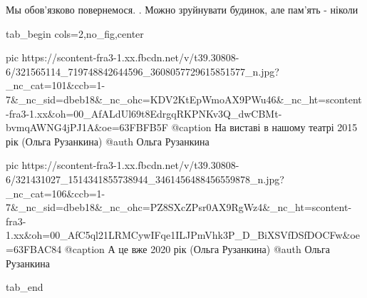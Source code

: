  
 
 
 
 


Мы обов'язково повернемося. . Можно зруйнувати будинок, але пам'ять - ніколи

\begin{center}
\begin{minipage}{\textwidth}

\ifcmt
  tab_begin cols=2,no_fig,center

     pic https://scontent-fra3-1.xx.fbcdn.net/v/t39.30808-6/321565114_719748842644596_3608057729615851577_n.jpg?_nc_cat=101&ccb=1-7&_nc_sid=dbeb18&_nc_ohc=KDV2KtEpWmoAX9PWu46&_nc_ht=scontent-fra3-1.xx&oh=00_AfALdUl69t8EdrgqRKPNKv3Q_dwCBMt-bvmqAWNG4jPJ1A&oe=63FBFB5F
     @caption На виставі в нашому театрі 2015 рік (Ольга Рузанкина)
     @auth Ольга Рузанкина

     pic https://scontent-fra3-1.xx.fbcdn.net/v/t39.30808-6/321431027_1514341855738944_3461456488456559878_n.jpg?_nc_cat=106&ccb=1-7&_nc_sid=dbeb18&_nc_ohc=PZ8SXcZPsr0AX9RgWz4&_nc_ht=scontent-fra3-1.xx&oh=00_AfC5ql21LRMCywIFqe1ILJPmVhk3P_D_BiXSVfDSfDOCFw&oe=63FBAC84
     @caption А це вже 2020 рік (Ольга Рузанкина)
     @auth Ольга Рузанкина

  tab_end
\fi

\end{minipage}
\end{center}

